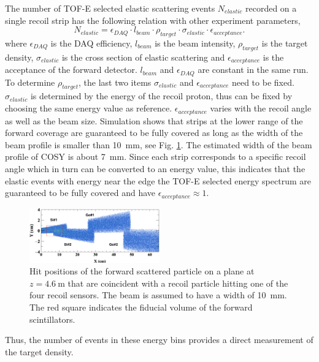 \documentclass[fleqn,twocolumn,a4paper]{ikpar}
\begin{document}
\par
\medskip

The number of TOF-E selected elastic scattering events $N_{elastic}$ recorded on a single recoil strip has the
following relation with other experiment parameters,
\begin{equation}
  N_{elastic} = \epsilon_{DAQ}\cdot l_{beam}\cdot\rho_{target}\cdot\sigma_{elastic}\cdot\epsilon_{acceptance}.
\end{equation}
where $\epsilon_{DAQ}$ is the DAQ efficiency, $l_{beam}$ is the beam intensity, $\rho_{target}$ is the target density,
$\sigma_{elastic}$ is the cross section of elastic scattering and
$\epsilon_{acceptance}$ is the acceptance of the forward detector.
$l_{beam}$ and $\epsilon_{DAQ}$ are constant in the same run.
To determine $\rho_{target}$, the last two items $\sigma_{elastic}$ and
$\epsilon_{acceptance}$ need to be fixed.
$\sigma_{elastic}$ is determined by the energy of the recoil proton, thus can be
fixed by choosing the same energy value as reference.
$\epsilon_{acceptance}$ varies with the recoil angle as well as the beam size.
Simulation shows that strips at the lower range of the forward coverage are
guaranteed to be fully covered as long as the width of the beam profile is
smaller than \SI{10}{\mm}, see Fig. \ref{fig:fwd_acceptance}.
The estimated width of the beam profile of COSY is about \SI{7}{\mm}.
Since each strip corresponds to a specific recoil angle which in turn
can be converted to an energy value, this indicates that the elastic events with
energy near the edge the TOF-E selected energy spectrum are guaranteed to be
fully covered and have $\epsilon_{acceptance} \approx 1$.
\begin{figure}[t!]
  \centering
	\includegraphics[width=0.5\textwidth]{./fwd_acceptance.png}
  \caption{
    Hit positions of the forward scattered particle on a plane at
    $z=\SI{4.6}{\m}$ that are coincident with a recoil particle hitting one of
    the four recoil sensors. The beam is assumed to have a width of \SI{10}{\mm}.
     The red square indicates the fiducial volume of the forward scintillators.}
  \label{fig:fwd_acceptance}
\end{figure}
Thus, the number of events in these energy bins provides a direct measurement of the target density.
\end{document}
